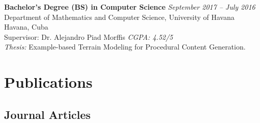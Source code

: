 \documentclass[10pt,a4paper]{article}
\begin{document}
\vspace{0.45em}
\textbf{Bachelor's Degree (BS) in Computer Science} \hfill \textit{September 2017 -- July 2016} \\
Department of Mathematics and Computer Science, University of Havana \hfill Havana, Cuba \\
Supervisor: Dr. Alejandro Piad Morffis \hfill \textit{CGPA: 4.52/5} \\
\textit{Thesis:} Example-based Terrain Modeling for Procedural Content Generation.

\section*{Publications}

\subsection*{Journal Articles}
\end{document}
